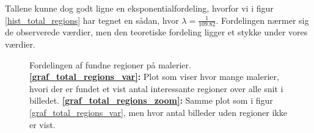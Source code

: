 {Tallene kunne dog godt ligne en eksponentialfordeling, hvorfor vi i
figur \ref{hist_total_regions} har tegnet en sådan, hvor $\lambda =
\frac{1}{109.82}$. Fordelingen nærmer sig de observerede værdier, men
den teoretiske fordeling ligger et stykke under vores værdier.

\begin{figure}[!h]
    \centering
    \caption[]{Fordelingen af fundne regioner på malerier.
    \textbf{\ref{graf_total_regions_var}:} Plot som viser hvor mange
    malerier, hvori der er fundet et vist antal interessante regioner
    over alle snit i billedet.  \textbf{\ref{graf_total_regions_zoom}:}
    Samme plot som i figur \ref{graf_total_regions_var}, men hvor antal
    billeder uden regioner ikke er vist.}
    \label{total_regions_plots}
\end{figure}

}
